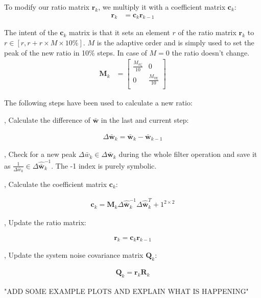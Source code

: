 \documentclass[class=article, crop=false]{standalone}
\begin{document}
To modify our ratio matrix $\textbf{r}_k$, we multiply it with a coefficient matrix $\textbf{c}_k$:
\begin{align*}
    \textbf{r}_{k} &= \textbf{c}_k \textbf{r}_{k-1}
\end{align*}

The intent of the $\textbf{c}_k$ matrix is that it sets an element $r$ of the ratio matrix $\textbf{r}_{k}$ to $r \in [r, r + r \times M \times 10\%]$. $M$ is the adaptive order and is simply used to set the peak of the new ratio in 10\% steps. In case of $M = 0$ the ratio doesn't change.
\begin{align*}
    \textbf{M}_{k} &=
    \begin{bmatrix}
   \frac{M_{\vartheta\zeta}}{10}   & 0              \\
   0 & \frac{M_{\eta\chi}}{10} \\
 \end{bmatrix}
\end{align*}


\noindent
The following steps have been used to calculate a new ratio:
\vspace{0.5cm}

, Calculate the difference of $\bar{\textbf{w}}$ in the last and current step:

\begin{align*}
\Delta \bar{\textbf{w}}_k = \bar{\textbf{w}}_k - \bar{\textbf{w}}_{k-1}
\end{align*}

, Check for a new peak $\Delta \bar{w}_k \in \Delta \bar{\textbf{w}}_k$ during the whole filter operation and save it as $ \frac{1}{\Delta \bar{w}_k} \in \Delta \hat{\bar{\textbf{w}}}_k^{-1}$. The -1 index is purely symbolic.

\vspace{1cm}
, Calculate the coefficient matrix $ \textbf{c}_k $:

\begin{align*}
\textbf{c}_k = \textbf{M}_k \Delta \hat{\bar{\textbf{w}}}_k^{-1} \Delta\hat{\bar{\textbf{w}}}_k^T + 1^{2 \times 2}
\end{align*}

, Update the ratio matrix:

\begin{align*}
\textbf{r}_{k} = \textbf{c}_k\textbf{r}_{k-1}
\end{align*}

, Update the system noise covariance matrix $\textbf{Q}_k$:

\begin{align*}
\textbf{Q}_k = \textbf{r}_k \textbf{R}_k
\end{align*}

"ADD SOME EXAMPLE PLOTS AND EXPLAIN WHAT IS HAPPENING"
\end{document}
